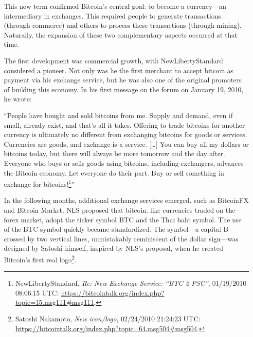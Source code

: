 \documentclass[
  a5paper,
  smalldemyvopaper,10pt,twoside,onecolumn,openright,extrafontsizes,hidelinks]{memoir}
\begin{document}
This new term confirmed Bitcoin's central goal: to become a
currency---an intermediary in exchanges. This required people to
generate transactions (through commerce) and others to process these
transactions (through mining). Naturally, the expansion of these two
complementary aspects occurred at that time.

The first development was commercial growth, with NewLibertyStandard
considered a pioneer. Not only was he the first merchant to accept
bitcoin as payment via his exchange service, but he was also one of the
original promoters of building this economy. In his first message on the
forum on January 19, 2010, he wrote:

``People have bought and sold bitcoins from me. Supply and demand, even
if small, already exist, and that's all it takes. Offering to trade
bitcoins for another currency is ultimately no different from exchanging
bitcoins for goods or services. Currencies are goods, and exchange is a
service. {[}\ldots{]} You can buy all my dollars or bitcoins today, but
there will always be more tomorrow and the day after. Everyone who buys
or sells goods using bitcoins, including exchangers, advances the
Bitcoin economy. Let everyone do their part. Buy or sell something in
exchange for bitcoins!\footnote{NewLibertyStandard, \emph{Re: New
  Exchange Service: ``BTC 2 PSC''}, 01/19/2010 08:06:15 UTC:
  \url{https://bitcointalk.org/index.php?topic=15.msg111\#msg111}.}''

In the following months, additional exchange services emerged, such as
BitcoinFX and Bitcoin Market. NLS proposed that bitcoin, like currencies
traded on the forex market, adopt the ticker symbol BTC and the Thai
baht symbol. The use of the BTC symbol quickly became standardized. The
symbol---a capital B crossed by two vertical lines, unmistakably
reminiscent of the dollar sign---was designed by Satoshi himself,
inspired by NLS's proposal, when he created Bitcoin's first real
logo\footnote{Satoshi Nakamoto, \emph{New icon/logo}, 02/24/2010
  21:24:23 UTC:
  \url{https://bitcointalk.org/index.php?topic=64.msg504\#msg504}.}.
\end{document}
